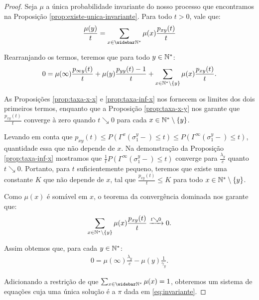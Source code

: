 \begin{proof}
  Seja $\mu$ a única probabilidade invariante do nosso processo que
  encontramos na Proposição \ref{prop:existe-unica-invariante}. Para
  todo $t > 0$, vale que:
  \begin{gather*}
    \frac{\mu(y)}{t} = \sum_{x \in \Nzb} \mu(x) \frac{p_{x y}
      (t)}{t}\\
  \end{gather*}

  Rearranjando os termos, teremos que para todo $y \in {\mathbb{N^*}}$:
  \begin{displaymath}
    0 = \mu(\infty) \frac{p_{\infty y}(t)}{t} + 
    \mu(y) \frac{p_{y y}(t) - 1}{t} + 
    \sum_{x \in {\mathbb{N^*}} \setminus \{y\}} \mu(x) \frac{p_{x
        y}(t)}{t}.
  \end{displaymath}

  As Proposições \ref{prop:taxa-x-x} e \ref{prop:taxa-inf-x} nos
  fornecem os limites dos dois primeiros termos, enquanto que a
  Proposição \ref{prop:taxa-x-y} nos garante que $\frac{p_{x
      y}(t)}{t}$ converge à zero quando $t \searrow 0$ para cada $x
  \in {\mathbb{N^*}} \setminus \{y\}$.

  Levando em conta que $p_{x y} (t) \leq P(\Gamma^x (\sigma_1^y -)
  \leq t) \leq P(\Gamma^\infty (\sigma_1^y -) \leq t)$, quantidade
  essa que não depende de $x$. Na demonstração da Proposição
  \ref{prop:taxa-inf-x} mostramos que $\frac{1}{t}P(\Gamma^\infty
  (\sigma_1^y -) \leq t)$ converge para $\frac{\lambda_y}{c}$ quanto
  $t \searrow 0$. Portanto, para $t$ suficientemente pequeno, teremos
  que existe uma constante $K$ que não depende de $x$, tal que
  $\frac{p_{x y}(t)}{t} \leq K$ para todo $x \in {\mathbb{N^*}}\setminus \{y\}$.

  Como $\mu(x)$ é somável em $x$, o teorema da convergência dominada
  nos garante que:
  \begin{displaymath}
    \sum_{x \in {\mathbb{N^*}} \setminus \{y\}} \mu(x)
    \frac{p_{x y}(t)}{t} \xrightarrow{t \searrow 0} 0.
  \end{displaymath}

  Assim obtemos que, para cada $y \in {\mathbb{N^*}}$:
  \begin{gather*}
    0 = \mu(\infty) \frac{\lambda_y}{c} - \mu(y) \frac{1}{\gamma_y}.
  \end{gather*}

  Adicionando a restrição de que $\sum_{x\in\Nzb}\mu(x) = 1$,
  obteremos um sistema de equações cuja uma única solução é a $\pi$
  dada em \eqref{eq:invariante}.
\end{proof}


